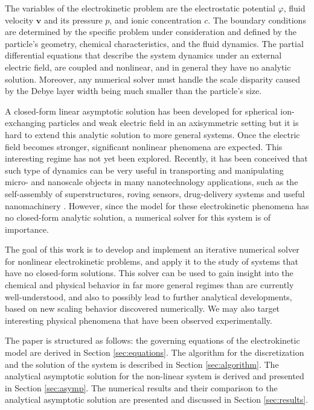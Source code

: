 \documentclass[final]{elsarticle}
\newcommand\bv{\boldsymbol{v}}
\begin{document}
The variables of the electrokinetic problem are the electrostatic
potential $\varphi$, fluid velocity $\bv$ and its pressure $p$, and
ionic concentration $c$.
The boundary conditions are determined by the specific
problem under consideration and defined by the particle's
geometry, chemical characteristics, and the fluid dynamics.
The partial differential equations that describe the system dynamics
under an external electric field, are coupled and nonlinear, and
in general they have no analytic solution. 
Moreover, any numerical solver must handle the scale disparity caused by the
Debye layer width being much smaller than the particle's size. 

A closed-form linear asymptotic solution has been developed for
spherical ion-exchanging particles and weak electric field in an
axisymmetric setting \cite{yariv2010migration} but it is hard to extend this
analytic solution to more general systems. Once the electric field
becomes stronger, significant nonlinear phenomena are expected.
This interesting regime has not yet been explored.
Recently, it has been conceived that such type of dynamics
can be very useful in transporting and manipulating micro-
and nanoscale objects in many nanotechnology applications,
such as the self-assembly of superstructures, roving sensors, 
drug-delivery systems and useful nanomachinery 
\cite{howse2007self,paxton2004catalytic,pumera2010electrochemically}.
However, since the model for these electrokinetic
phenomena has no closed-form analytic solution, a numerical
solver for this system is of importance.

The goal of this work is to develop and implement an iterative numerical
solver for nonlinear electrokinetic problems, and apply it to the study
of systems that have no closed-form solutions.
This solver can be used to gain insight into the chemical and physical behavior 
in far more general regimes than are currently well-understood, 
and also to possibly lead to further analytical developments, based on new scaling behavior
discovered numerically. We may also target interesting physical
phenomena that have been observed experimentally.

The paper is structured as follows: the governing equations of the electrokinetic model
are derived in Section \ref{sec:equations}. The algorithm for the discretization and 
the solution of the system is described in Section \ref{sec:algorithm}.
The analytical asymptotic solution for the non-linear system is derived 
and presented in Section \ref{sec:asymp}.
The numerical results and their comparison to the analytical asymptotic solution 
are presented and discussed in Section \ref{sec:results}. 
\end{document}
